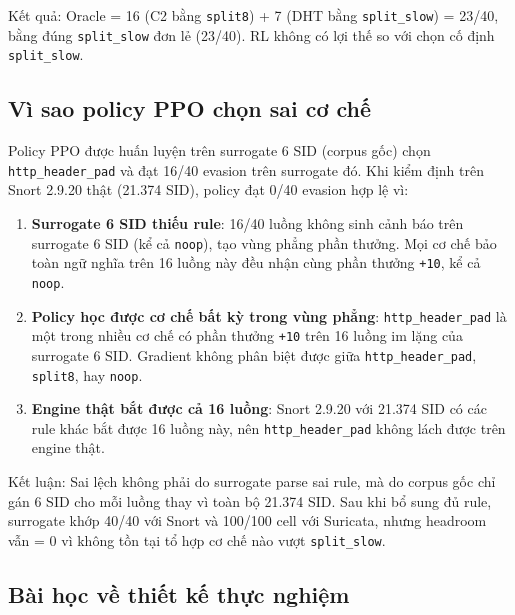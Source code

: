 \documentclass[12pt, a4paper, openany]{book}
\begin{document}
Kết quả: Oracle = 16 (C2 bằng \texttt{split8}) + 7 (DHT bằng \texttt{split\_slow}) = 23/40, bằng đúng \texttt{split\_slow} đơn lẻ (23/40). RL không có lợi thế so với chọn cố định \texttt{split\_slow}.

\subsection*{Vì sao policy PPO chọn sai cơ chế}

Policy PPO được huấn luyện trên surrogate 6 SID (corpus gốc) chọn \texttt{http\_header\_pad} và đạt 16/40 evasion trên surrogate đó. Khi kiểm định trên Snort 2.9.20 thật (21.374 SID), policy đạt 0/40 evasion hợp lệ vì:

\begin{enumerate}
    \item \textbf{Surrogate 6 SID thiếu rule}: 16/40 luồng không sinh cảnh báo trên surrogate 6 SID (kể cả \texttt{noop}), tạo vùng phẳng phần thưởng. Mọi cơ chế bảo toàn ngữ nghĩa trên 16 luồng này đều nhận cùng phần thưởng \texttt{+10}, kể cả \texttt{noop}.
    \item \textbf{Policy học được cơ chế bất kỳ trong vùng phẳng}: \texttt{http\_header\_pad} là một trong nhiều cơ chế có phần thưởng \texttt{+10} trên 16 luồng im lặng của surrogate 6 SID. Gradient không phân biệt được giữa \texttt{http\_header\_pad}, \texttt{split8}, hay \texttt{noop}.
    \item \textbf{Engine thật bắt được cả 16 luồng}: Snort 2.9.20 với 21.374 SID có các rule khác bắt được 16 luồng này, nên \texttt{http\_header\_pad} không lách được trên engine thật.
\end{enumerate}

Kết luận: Sai lệch không phải do surrogate parse sai rule, mà do corpus gốc chỉ gán 6 SID cho mỗi luồng thay vì toàn bộ 21.374 SID. Sau khi bổ sung đủ rule, surrogate khớp 40/40 với Snort và 100/100 cell với Suricata, nhưng headroom vẫn = 0 vì không tồn tại tổ hợp cơ chế nào vượt \texttt{split\_slow}.

\subsection*{Bài học về thiết kế thực nghiệm}
\end{document}
